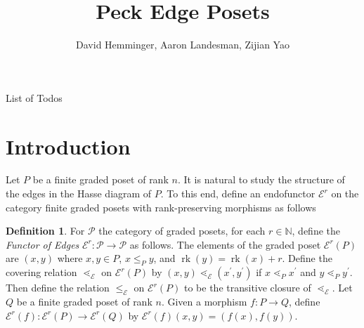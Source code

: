 \documentclass[10 pt]{amsart}
\title{Peck Edge Posets}
\author{David Hemminger, Aaron Landesman, Zijian Yao}
\makeatletter
\theoremstyle{plain}
\theoremstyle{definition}
\newtheorem{defn}[thm]{Definition}
\theoremstyle{remark}
\numberwithin{equation}{section}
\newcommand\BN{{\mathbb N}}
\newcommand\rk{\operatorname{rk}}
\def\listtodoname{List of Todos}
\def\listoftodos{\@starttoc{tdo}\listtodoname}
\makeatother
\begin{document}
\listoftodos
\newpage

\maketitle

\tableofcontents


\section{Introduction}\label{sec:introduction}

Let $P$ be a finite graded poset of rank $n$.  It is natural to study the structure of the edges in the Hasse diagram of $P$.  To this end, define an endofunctor $\mathcal E^r$ on the category finite graded posets with rank-preserving morphisms as follows

\begin{defn}
\label{defn:functor_of_edges}
For $\mathcal P$ the category of graded posets, for each $r \in \BN$, define the {\it Functor of Edges} $\mathcal E^r:\mathcal P \rightarrow \mathcal P$ as follows. The elements of the graded poset $\mathcal E^r(P)$ are $(x, y)$ where $x,y\in P$, $x\le_P y$, and $\rk(y) = \rk(x) + r$. Define the covering relation $\lessdot_{\mathcal E}$ on $\mathcal E^r(P)$ by $(x, y) \lessdot_{\mathcal E} (x^\prime, y^\prime)$ if $x\lessdot_P x^\prime$ and $y\lessdot_P y^\prime$.  Then define the relation $\le_{\mathcal E}$ on $\mathcal E^r(P)$ to be the transitive closure of $\lessdot_{\mathcal E}.$
Let $Q$ be a finite graded poset of rank $n$.  Given a morphism $f\colon P\rightarrow Q$, define $\mathcal E^r(f)\colon \mathcal E^r(P)\rightarrow \mathcal E^r(Q)$ by $\mathcal E^r(f)(x,y) = (f(x), f(y))$.
\end{defn}
\end{document}
